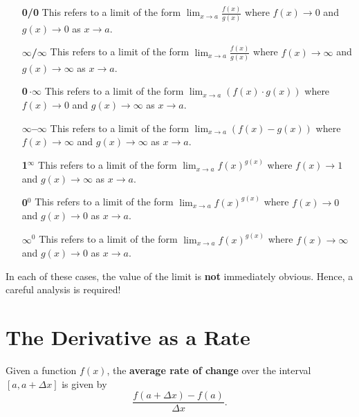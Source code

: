 \documentclass{ximera}
\begin{document}
\begin{definition}\hfil
\begin{itemize}
\item[\textbf{0/0}] This refers to a limit of the form $\lim_{x\to a}
\frac{f(x)}{g(x)}$ where $f(x)\to 0$ and $g(x)\to 0$ as $x\to a$.
\item[\textbf{$\pmb\infty$/$\pmb\infty$}] This refers to a limit of the form $\lim_{x\to a}
\frac{f(x)}{g(x)}$ where $f(x)\to \infty$ and $g(x)\to \infty$ as $x\to a$.
\item[\textbf{0\,$\pmb{\cdot\infty}$}] This refers to a limit of the form $\lim_{x\to a}
\left(f(x)\cdot g(x)\right)$ where $f(x)\to 0$ and $g(x)\to \infty$ as $x\to a$.
\item[\textbf{$\pmb\infty$--$\pmb\infty$}] This refers to a limit of the form $\lim_{x\to a}\left(
f(x)-g(x)\right)$ where $f(x)\to \infty$ and $g(x)\to \infty$ as $x\to a$.
\item[\textbf{1$^{\pmb\infty}$}] This refers to a limit of the form $\lim_{x\to a}
f(x)^{g(x)}$ where $f(x)\to 1$ and $g(x)\to \infty$ as $x\to a$.
\item[\textbf{0$^\text{0}$}] This refers to a limit of the form $\lim_{x\to a}
f(x)^{g(x)}$ where $f(x)\to 0$ and $g(x)\to 0$ as $x\to a$.
\item[\textbf{$\pmb\infty^\text{0}$}] This refers to a limit of the form $\lim_{x\to a}
f(x)^{g(x)}$ where $f(x)\to \infty$ and $g(x)\to 0$ as $x\to a$.
\end{itemize}
In each of these cases, the value of the limit is \textbf{not} immediately
obvious. Hence, a careful analysis is required!
\end{definition}







\section*{The Derivative as a Rate}







\begin{definition}
Given a function $f(x)$, the \textbf{average rate of change} over the
interval $[a, a+\Delta x]$ is given by
\[
\frac{f(a+\Delta x) - f(a)}{\Delta x}.
\]
\end{definition}
\end{document}
